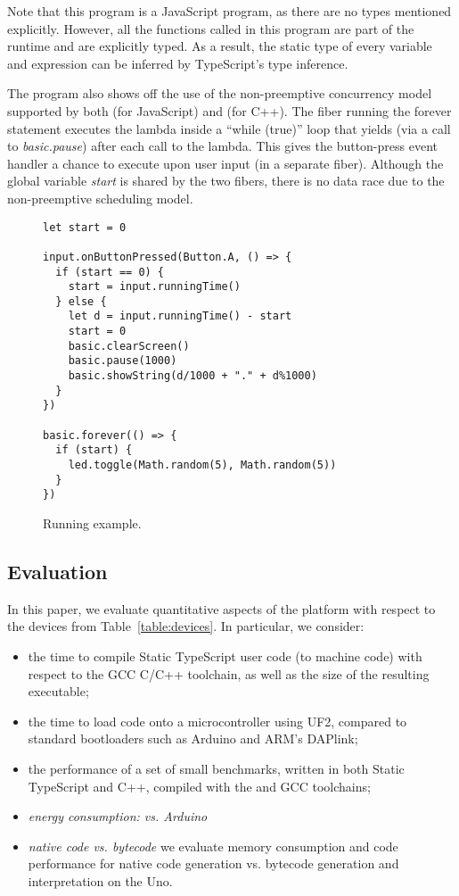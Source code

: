 Note that this program is a JavaScript program, as there are no 
types mentioned explicitly. However, all the functions called in
this program are part of the runtime and are explicitly
typed.  As a result, the static type of every variable and expression
can be inferred by TypeScript's type inference.

The program also shows off the use of the non-preemptive concurrency
model supported by both \MC (for JavaScript) and \CO (for C++). 
The fiber running the forever statement executes the lambda inside a ``while (true)'' 
loop that yields (via a call to \emph{basic.pause}) after each call to the lambda.
This gives the button-press event handler a chance to execute
upon user input (in a separate fiber). Although the global variable \emph{start} is 
shared by the two fibers, there is no data race due to the non-preemptive 
scheduling model. 


\begin{figure}
\begin{lstlisting}
let start = 0

input.onButtonPressed(Button.A, () => {
  if (start == 0) {
    start = input.runningTime()
  } else {
    let d = input.runningTime() - start
    start = 0 
    basic.clearScreen()
    basic.pause(1000)
    basic.showString(d/1000 + "." + d%1000)
  }
})

basic.forever(() => {
  if (start) {
    led.toggle(Math.random(5), Math.random(5))
  }
})
\end{lstlisting}
\caption{\label{fig:example}Running example.}
\end{figure}

\subsection{Evaluation}

In this paper, we evaluate quantitative aspects of the platform
with respect to the devices from Table~\ref{table:devices}. In particular, we
consider:
\begin{itemize}
\item the time to compile Static TypeScript user code (to machine code) with respect
      to the GCC C/C++ toolchain, as well as the size of the resulting executable;
\item the time to load code onto a microcontroller using UF2, compared to standard bootloaders
      such as Arduino and ARM's DAPlink;
\item the performance of a set of small benchmarks, written in both Static TypeScript and C++,
      compiled with the \MC and GCC toolchains;
\item \emph{energy consumption: \CO vs. Arduino}
\item \emph{native code vs. bytecode} we
      evaluate memory consumption and code performance for native code generation
      vs. bytecode generation and interpretation on the Uno.
\end{itemize}

